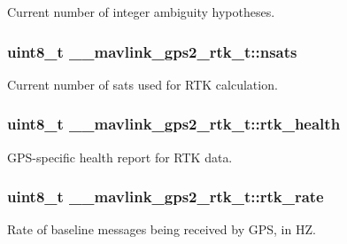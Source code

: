 Current number of integer ambiguity hypotheses. 

\hypertarget{struct____mavlink__gps2__rtk__t_a8b763c1a2f4b06532c12a5072967bb33}{
\subsubsection[{nsats}]{\setlength{\rightskip}{0pt plus 5cm}uint8\+\_\+t \+\_\+\+\_\+mavlink\+\_\+gps2\+\_\+rtk\+\_\+t\+::nsats}}\label{struct____mavlink__gps2__rtk__t_a8b763c1a2f4b06532c12a5072967bb33}


Current number of sats used for R\+T\+K calculation. 

\hypertarget{struct____mavlink__gps2__rtk__t_a44ed802f870c5ec089e46c9d8a732b46}{
\subsubsection[{rtk\+\_\+health}]{\setlength{\rightskip}{0pt plus 5cm}uint8\+\_\+t \+\_\+\+\_\+mavlink\+\_\+gps2\+\_\+rtk\+\_\+t\+::rtk\+\_\+health}}\label{struct____mavlink__gps2__rtk__t_a44ed802f870c5ec089e46c9d8a732b46}


G\+P\+S-\/specific health report for R\+T\+K data. 

\hypertarget{struct____mavlink__gps2__rtk__t_ad9801921d6a4e409f0d3d9d796a7b1c4}{
\subsubsection[{rtk\+\_\+rate}]{\setlength{\rightskip}{0pt plus 5cm}uint8\+\_\+t \+\_\+\+\_\+mavlink\+\_\+gps2\+\_\+rtk\+\_\+t\+::rtk\+\_\+rate}}\label{struct____mavlink__gps2__rtk__t_ad9801921d6a4e409f0d3d9d796a7b1c4}


Rate of baseline messages being received by G\+P\+S, in H\+Z. 

